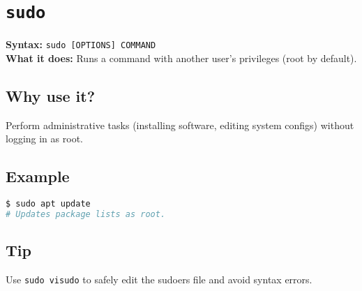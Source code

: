 \documentclass[10pt,oneside]{scrbook}
\begin{document}
\section{\texttt{sudo}}
\begin{cmdbox}
  \textbf{Syntax:} \lstinline!sudo [OPTIONS] COMMAND! \\
  \textbf{What it does:} Runs a command with another user’s privileges (root by default).
\end{cmdbox}
\begin{commanddetails}
  \subsection*{Why use it?}
    Perform administrative tasks (installing software, editing system configs) without logging in as root.

  \subsection*{Example}
  \begin{lstlisting}[language=bash]
$ sudo apt update
# Updates package lists as root.
  \end{lstlisting}

  \subsection*{Tip}
    Use \lstinline!sudo visudo! to safely edit the sudoers file and avoid syntax errors.
\end{commanddetails}

\end{document}
